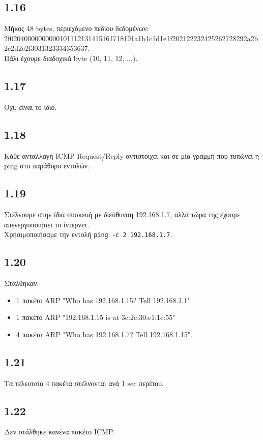 		\subsection*{1.16}
			Μήκος 48 bytes, περιεχόμενο πεδίου δεδομένων: \\
			
			2f02040000000000101112131415161718191a1b1c1d1e1f202122232425262728292a2b2c2d2e2f3031323334353637. \\ 
			
			Πάλι έχουμε διαδοχικά byte (10, 11, 12, ...).
	
		\subsection*{1.17}
			Όχι, είναι το ίδιο.
	
		\subsection*{1.18}
			Κάθε ανταλλαγή ICMP Request/Reply αντιστοιχεί και σε μία γραμμή που τυπώνει η ping στο παράθυρο εντολών.
	
		\subsection*{1.19}
			Στέλνουμε στην ίδια συσκευή με διεύθυνση 192.168.1.7, αλλά τώρα της έχουμε απενεργοποιήσει το ίντερνετ. \\
			Χρησιμοποιήσαμε την εντολή \verb|ping -c 2 192.168.1.7|.
	
		\subsection*{1.20}
			Στάλθηκαν:
			\begin{itemize}
				\item 1 πακέτο ARP "Who has 192.168.1.15? Tell 192.168.1.1"
				\item 1 πακέτο ARP "192.168.1.15 is at 3c:2c:30:e1:1c:55"
				\item 4 πακέτα ARP "Who has 192.168.1.7? Tell 192.168.1.15".	
			\end{itemize} 
	
		\subsection*{1.21}
			Τα τελευταία 4 πακέτα στέλνονται ανά 1 sec περίπου.
	
		\subsection*{1.22}
			Δεν στάλθηκε κανένα πακέτο ICMP.
	
